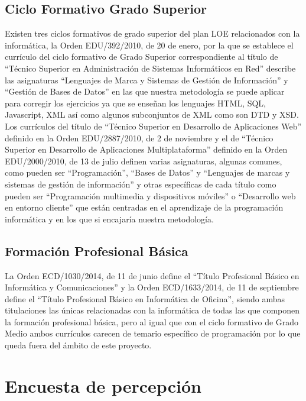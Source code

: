 \subsection {Ciclo Formativo Grado Superior}

Existen tres ciclos formativos de grado superior del plan LOE relacionados con la informática, la Orden EDU/392/2010, de 20 de enero, por la que se establece el currículo del ciclo formativo de Grado Superior correspondiente al título de ``Técnico Superior en Administración de Sistemas Informáticos en Red'' describe las asignaturas ``Lenguajes de Marca y Sistemas de Gestión de Información'' y ``Gestión de Bases de Datos'' en las que nuestra metodología se puede aplicar para corregir los ejercicios ya que se enseñan los lenguajes HTML, SQL, Javascript, XML así como algunos subconjuntos de XML como son DTD y XSD. Los currículos del título de ``Técnico Superior en Desarrollo de Aplicaciones Web'' definido en la Orden EDU/2887/2010, de 2 de noviembre y el de ``Técnico Superior en Desarrollo de Aplicaciones Multiplataforma'' definido en la Orden EDU/2000/2010, de 13 de julio definen varias asignaturas, algunas comunes, como pueden ser ``Programación'', ``Bases de Datos'' y ``Lenguajes de marcas y sistemas de gestión de información'' y otras específicas de cada título como pueden ser ``Programación multimedia y dispositivos móviles'' o ``Desarrollo web en entorno cliente'' que están centradas en el aprendizaje de la programación informática y en los que si encajaría nuestra metodología.


\subsection {Formación Profesional Básica}

La Orden ECD/1030/2014, de 11 de junio define el ``Título Profesional Básico en Informática y Comunicaciones'' y la Orden ECD/1633/2014, de 11 de septiembre define el  ``Título Profesional Básico en Informática de Oficina'', siendo ambas titulaciones las únicas relacionadas con la informática de todas las que componen la formación profesional básica, pero al igual que con el ciclo formativo de Grado Medio ambos currículos carecen de temario específico de programación por lo que queda fuera del ámbito de este proyecto.


\section{Encuesta de percepción}

